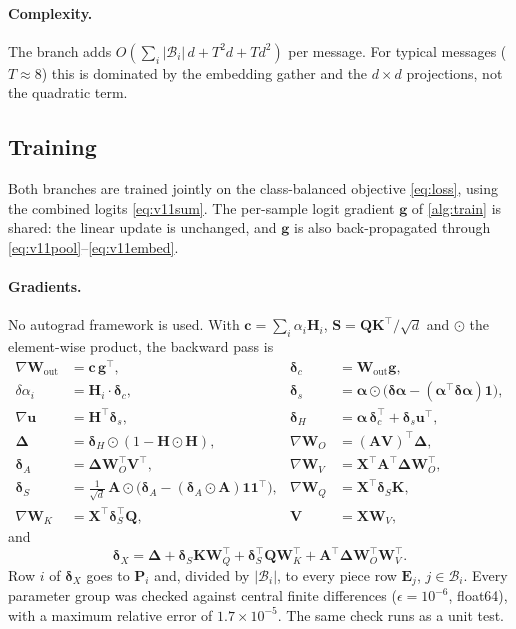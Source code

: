 \documentclass[11pt,a4paper]{article}
\theoremstyle{remark}
\begin{document}
\paragraph{Complexity.} The branch adds $O(\sum_i|\mathcal{B}_i|\,d + T^2 d + T d^2)$
per message. For typical messages ($T\approx 8$) this is dominated by the
embedding gather and the $d\times d$ projections, not the quadratic term.

\subsection{Training}
\label{sec:v11train}

Both branches are trained jointly on the class-balanced objective
\eqref{eq:loss}, using the combined logits \eqref{eq:v11sum}. The per-sample
logit gradient $\bm g$ of \cref{alg:train} is shared: the linear update is
unchanged, and $\bm g$ is also back-propagated through
\eqref{eq:v11pool}--\eqref{eq:v11embed}.

\paragraph{Gradients.} No autograd framework is used. With $\bm c=\sum_i\alpha_i\bm H_i$,
$\bm S=\bm Q\bm K^{\!\top}\!/\sqrt d$ and $\odot$ the element-wise product,
the backward pass is
\begin{align*}
  \nabla\bm W_{\text{out}} &= \bm c\,\bm g^{\!\top}, &
  \bm\delta_c &= \bm W_{\text{out}}\bm g,\\
  \delta\alpha_i &= \bm H_i\cdot\bm\delta_c, &
  \bm\delta_s &= \bm\alpha\odot\big(\bm{\delta\alpha} - (\bm\alpha^{\!\top}\bm{\delta\alpha})\bm 1\big),\\
  \nabla\bm u &= \bm H^{\!\top}\bm\delta_s, &
  \bm\delta_H &= \bm\alpha\,\bm\delta_c^{\!\top} + \bm\delta_s\bm u^{\!\top},\\
  \bm\Delta &= \bm\delta_H\odot(1-\bm H\odot\bm H), &
  \nabla\bm W_O &= (\bm A\bm V)^{\!\top}\bm\Delta,\\
  \bm\delta_A &= \bm\Delta\bm W_O^{\!\top}\bm V^{\!\top}, &
  \nabla\bm W_V &= \bm X^{\!\top}\bm A^{\!\top}\bm\Delta\bm W_O^{\!\top},\\
  \bm\delta_S &= \tfrac{1}{\sqrt d}\,\bm A\odot\big(\bm\delta_A - (\bm\delta_A\odot\bm A)\bm 1\bm 1^{\!\top}\big), &
  \nabla\bm W_Q &= \bm X^{\!\top}\bm\delta_S\bm K,\\
  \nabla\bm W_K &= \bm X^{\!\top}\bm\delta_S^{\!\top}\bm Q, &
  \bm V &= \bm X\bm W_V,
\end{align*}
and
\begin{equation*}
  \bm\delta_X=\bm\Delta+\bm\delta_S\bm K\bm W_Q^{\!\top}+\bm\delta_S^{\!\top}\bm Q\bm W_K^{\!\top}
  +\bm A^{\!\top}\bm\Delta\bm W_O^{\!\top}\bm W_V^{\!\top}.
\end{equation*}
Row $i$ of $\bm\delta_X$ goes to $\bm P_i$ and, divided by $|\mathcal{B}_i|$, to every
piece row $\bm E_j$, $j\in\mathcal{B}_i$. Every parameter group was checked against central
finite differences ($\epsilon=10^{-6}$, float64), with a maximum relative error
of $1.7\times10^{-5}$. The same check runs as a unit test.
\end{document}
